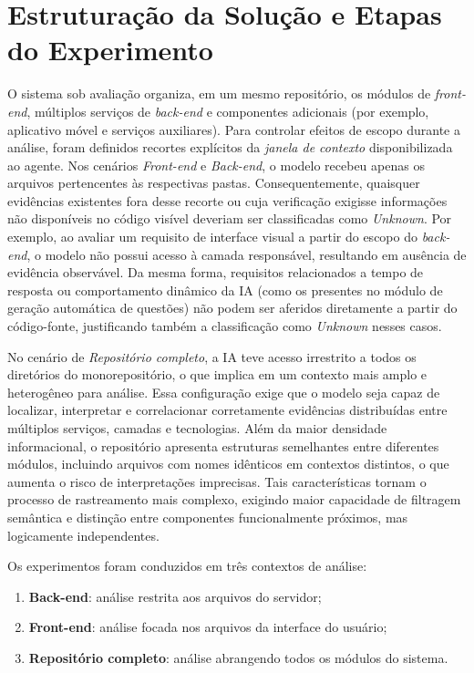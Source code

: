 \section{Estruturação da Solução e Etapas do Experimento}
O sistema sob avaliação organiza, em um mesmo repositório, os módulos de \textit{front-end}, múltiplos serviços de \textit{back-end} e componentes adicionais (por exemplo, aplicativo móvel e serviços auxiliares). Para controlar efeitos de escopo durante a análise, foram definidos recortes explícitos da \textit{janela de contexto} disponibilizada ao agente. Nos cenários \textit{Front-end} e \textit{Back-end}, o modelo recebeu apenas os arquivos pertencentes às respectivas pastas. Consequentemente, quaisquer evidências existentes fora desse recorte ou cuja verificação exigisse informações não disponíveis no código visível deveriam ser classificadas como \textit{Unknown}. Por exemplo, ao avaliar um requisito de interface visual a partir do escopo do \textit{back-end}, o modelo não possui acesso à camada responsável, resultando em ausência de evidência observável. Da mesma forma, requisitos relacionados a tempo de resposta ou comportamento dinâmico da IA (como os presentes no módulo de geração automática de questões) não podem ser aferidos diretamente a partir do código-fonte, justificando também a classificação como \textit{Unknown} nesses casos.

No cenário de \textit{Repositório completo}, a IA teve acesso irrestrito a todos os diretórios do monorepositório, o que implica em um contexto mais amplo e heterogêneo para análise. Essa configuração exige que o modelo seja capaz de localizar, interpretar e correlacionar corretamente evidências distribuídas entre múltiplos serviços, camadas e tecnologias. Além da maior densidade informacional, o repositório apresenta estruturas semelhantes entre diferentes módulos, incluindo arquivos com nomes idênticos em contextos distintos, o que aumenta o risco de interpretações imprecisas. Tais características tornam o processo de rastreamento mais complexo, exigindo maior capacidade de filtragem semântica e distinção entre componentes funcionalmente próximos, mas logicamente independentes.

Os experimentos foram conduzidos em três contextos de análise:
\begin{enumerate}
    \item \textbf{Back-end}: análise restrita aos arquivos do servidor;
    \item \textbf{Front-end}: análise focada nos arquivos da interface do usuário;
    \item \textbf{Repositório completo}: análise abrangendo todos os módulos do sistema.
\end{enumerate}

